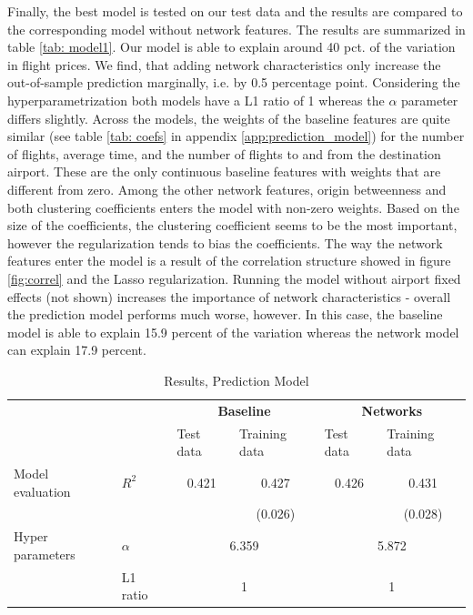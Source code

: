 Finally, the best model is tested on our test data and the results are compared to the corresponding model without network features. The results are summarized in table \ref{tab: model1}. Our model is able to explain around 40 pct. of the variation in flight prices. We find, that adding network characteristics only increase the out-of-sample prediction marginally, i.e. by 0.5 percentage point. Considering the hyperparametrization both models have a L1 ratio of 1 whereas the $\alpha$ parameter differs slightly. Across the models, the weights of the baseline features are quite similar (see table \ref{tab: coefs} in appendix \ref{app:prediction_model}) for the number of flights, average time, and the number of flights to and from the destination airport. These are the only continuous baseline features with weights that are different from zero. Among the other network features, origin betweenness and both clustering coefficients enters the model with non-zero weights. Based on the size of the coefficients, the clustering coefficient seems to be the most important, however the regularization tends to bias the coefficients. The way the network features enter the model is a result of the correlation structure showed in figure \ref{fig:correl} and the Lasso regularization. Running the model without airport fixed effects (not shown) increases the importance of network characteristics - overall the prediction model performs much worse, however. In this case, the baseline model is able to explain 15.9 percent of the variation whereas the network model can explain 17.9 percent.
\FloatBarrier
\begin{table}[htbp]
  \centering
  \caption{Results, Prediction Model}
  \label{tab: model1}
    \begin{tabular}{rlcccc}
    \hline
          &       & \multicolumn{2}{c}{\textbf{Baseline}} & \multicolumn{2}{c}{\textbf{Networks}} \\ 
          &       & \multicolumn{1}{l}{Test data} & \multicolumn{1}{l}{Training data} & \multicolumn{1}{l}{Test data} & \multicolumn{1}{l}{Training data} \\ \hline
    \multicolumn{1}{l}{Model evaluation} & $R^2$  & \multicolumn{1}{c}{0.421} & \multicolumn{1}{c}{0.427} & \multicolumn{1}{c}{0.426} & \multicolumn{1}{c}{0.431} \\
          &       &  &  \multicolumn{1}{c}{(0.026)}     &       & \multicolumn{1}{c}{(0.028)} \\
    \multicolumn{1}{l}{Hyper parameters} & $\alpha$ & \multicolumn{2}{c}{6.359} & \multicolumn{2}{c}{5.872} \\
          & L1 ratio & \multicolumn{2}{c}{1} & \multicolumn{2}{c}{1} \\ \hline
    \end{tabular}%
  \label{tab:addlabel}%
\end{table}%
\FloatBarrier
